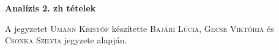 \documentclass[a4paper,11.5pt]{article}
\begin{document}


	\def\a{\textbf{a}}

	\def\b{\textbf{b}}

	\def\N{\hskip 10 true mm}

	\def\a{\textbf{a}}

	\def\b{\textbf{b}}

	\def\c{\textbf{c}}

	\def\d{\textbf{d}}

	\def\e{\textbf{e}}

	\def\gg{$\gamma$}

	\def\vi{\textbf{i}}

	\def\jj{\textbf{j}}

	\def\kk{\textbf{k}}

	\def\fh{\overrightarrow}

	\def\l{\lambda}

	\def\m{\mu}

	\def\v{\textbf{v}}

	\def\0{\textbf{0}}

	\def\s{\hspace{0.2mm}\vphantom{\beta}}

	\def\Z{\mathbb{Z}}
	\def\Q{\mathbb{Q}}
	\def\R{\mathbb{R}}
	\def\C{\mathbb{C}}
	\def\N{\mathbb{N}}
	\def\Rn{\mathbb{R}^{n}}
	\def\Ra{\overline{\mathbb{R}}}
	\def\sume{\displaystyle\sum_{n=1}^{+\infty}}
	\def\sumn{\displaystyle\sum_{n=0}^{+\infty}}
	\def\biz{\emph{Bizonyítás:\ }}
	\def\narrow{\underset{n\rightarrow+\infty}{\longrightarrow}}
	\def\limn{\displaystyle\lim_{n\to +\infty}}
	
	\begin{center}
		\textbf{Analízis 2. zh tételek}
	\end{center}
	
	\noindent A jegyzetet \textsc{Umann Kristóf} készítette \textsc{Bajári Lúcia}, \textsc{Gecse Viktória} és \\ \textsc{Csonka Szilvia} jegyzete alapján. 
	
\end{document}

